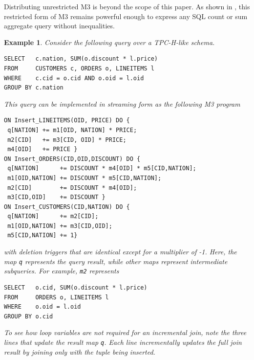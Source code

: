 \documentclass{vldb}
\newtheorem{example}[theorem]{Example}
\begin{document}
Distributing unrestricted M3 is beyond the scope of this paper.  As shown in \cite{dbtoaster-pods}, this restricted form of M3 remains powerful enough to express any SQL count or sum aggregate query without inequalities.  

\begin{example}
Consider the following query over a TPC-H-like schema.
\begin{verbatim}
SELECT   c.nation, SUM(o.discount * l.price)
FROM     CUSTOMERS c, ORDERS o, LINEITEMS l
WHERE    c.cid = o.cid AND o.oid = l.oid
GROUP BY c.nation
\end{verbatim}

This query can be implemented in streaming form as the following M3 program
\begin{verbatim}
ON Insert_LINEITEMS(OID, PRICE) DO {
 q[NATION] += m1[OID, NATION] * PRICE;
 m2[CID]   += m3[CID, OID] * PRICE;
 m4[OID]   += PRICE }
ON Insert_ORDERS(CID,OID,DISCOUNT) DO {
 q[NATION]      += DISCOUNT * m4[OID] * m5[CID,NATION];
 m1[OID,NATION] += DISCOUNT * m5[CID,NATION];
 m2[CID]        += DISCOUNT * m4[OID];
 m3[CID,OID]    += DISCOUNT }
ON Insert_CUSTOMERS(CID,NATION) DO {
 q[NATION]      += m2[CID];
 m1[OID,NATION] += m3[CID,OID];
 m5[CID,NATION] += 1}
\end{verbatim}
with deletion triggers that are identical except for a multiplier of -1.  Here, the map \texttt{q} represents the query result, while other maps represent intermediate subqueries.  For example, \texttt{m2} represents 
\begin{verbatim}
SELECT   o.cid, SUM(o.discount * l.price) 
FROM     ORDERS o, LINEITEMS l
WHERE    o.oid = l.oid
GROUP BY o.cid
\end{verbatim}
To see how loop variables are not required for an incremental join, note the three lines that update the result map \texttt{q}.  Each line incrementally updates the full join result by joining only with the tuple being inserted.
\end{example}
\end{document}
